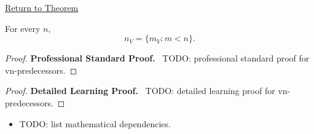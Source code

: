 \newpage
{}
\label{prf:vn-predecessors}

\begin{remark*}[Return]
\hyperref[cor:vn-predecessors]{Return to Theorem}
\end{remark*}

\begin{theorem*}
For every $n$,
\[
n_V = \{m_V : m<n\}.
\]
\end{theorem*}

\begin{proof}
\textbf{Professional Standard Proof.}~
TODO: professional standard proof for vn-predecessors.
\end{proof}

\begin{proof}
\textbf{Detailed Learning Proof.}~
TODO: detailed learning proof for vn-predecessors.
\end{proof}

\begin{remark*}
\end{remark*}

\begin{dependencies}
\begin{itemize}
  \item TODO: list mathematical dependencies.
\end{itemize}
\end{dependencies}

\clearpage
